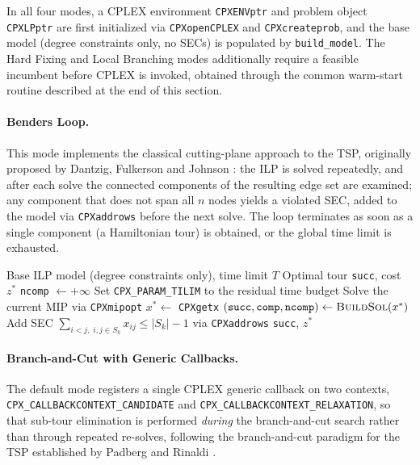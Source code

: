 \documentclass{article}
\begin{document}
In all four modes, a CPLEX environment \texttt{CPXENVptr} and problem object
\texttt{CPXLPptr} are first initialized via \texttt{CPXopenCPLEX} and \texttt{CPXcreateprob},
and the base model (degree constraints only, no SECs) is populated by \texttt{build\_model}.
The Hard Fixing and Local Branching modes additionally require a feasible incumbent before
CPLEX is invoked, obtained through the common warm-start routine described at the end of this
section.

\paragraph{Benders Loop.}
This mode implements the classical cutting-plane approach to the TSP, originally proposed by
Dantzig, Fulkerson and Johnson \cite{dantzig1954}: the ILP is solved repeatedly, and after each
solve the connected components of the resulting edge set are examined; any component that does
not span all $n$ nodes yields a violated SEC, added to the model via \texttt{CPXaddrows}
before the next solve. The loop terminates as soon as a single component (a Hamiltonian tour)
is obtained, or the global time limit is exhausted.

\begin{algorithm}[H]
\caption{Benders Loop for the TSP (\texttt{TSPopt\_benders})}
\label{alg:benders}
\begin{algorithmic}[1]
\Require Base ILP model (degree constraints only), time limit $T$
\Ensure Optimal tour \texttt{succ}, cost $z^*$
\State \texttt{ncomp} $\leftarrow +\infty$
\Repeat
    \State Set \texttt{CPX\_PARAM\_TILIM} to the residual time budget
    \State Solve the current MIP via \texttt{CPXmipopt}
    \State $x^* \leftarrow$ \texttt{CPXgetx}
    \State $(\texttt{succ}, \texttt{comp}, \texttt{ncomp}) \leftarrow \textsc{BuildSol}(x^*)$
            \State Add SEC $\displaystyle\sum_{i<j,\; i,j \in S_k} x_{ij} \leq |S_k| - 1$ via \texttt{CPXaddrows}
        \EndFor
    \EndIf
{}
\State \Return \texttt{succ}, $z^*$
\end{algorithmic}
\end{algorithm}

\paragraph{Branch-and-Cut with Generic Callbacks.}
The default mode registers a single CPLEX generic callback on two contexts,
\texttt{CPX\_CALLBACKCONTEXT\_CANDIDATE} and \texttt{CPX\_CALLBACKCONTEXT\_RELAXATION}, so that
sub-tour elimination is performed \textit{during} the branch-and-cut search rather than through
repeated re-solves, following the branch-and-cut paradigm for the TSP established by Padberg
and Rinaldi \cite{padberg1991}.
\end{document}
